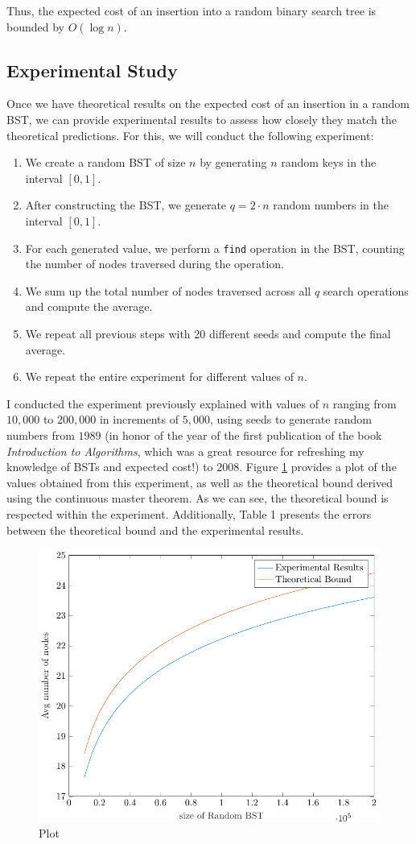 Thus, the expected cost of an insertion into a random binary search tree is bounded by \( O(\log n) \).

\subsection{Experimental Study}
Once we have theoretical results on the expected cost of an insertion in a random BST, we can provide experimental results to assess how closely they match the theoretical predictions. For this, we will conduct the following experiment:

\begin{enumerate}
    \item We create a random BST of size \( n \) by generating \( n \) random keys in the interval \( [0,1] \).
    \item After constructing the BST, we generate \( q = 2\cdot n \) random numbers in the interval \( [0,1] \).
    \item For each generated value, we perform a \texttt{find} operation in the BST, counting the number of nodes traversed during the operation.
    \item We sum up the total number of nodes traversed across all \( q \) search operations and compute the average.
    \item We repeat all previous steps with 20 different seeds and compute the final average.
    \item We repeat the entire experiment for different values of \( n \).
\end{enumerate}

I conducted the experiment previously explained with values of $n$ ranging from $10,000$ to $200,000$ in increments of $5,000$, using seeds to generate random numbers from $1989$ (in honor of the year of the first publication of the book \textit{Introduction to Algorithms}, which was a great resource for refreshing my knowledge of BSTs and expected cost!) to $2008$. Figure \ref{fig:plotBoundIns} provides a plot of the values obtained from this experiment, as well as the theoretical bound derived using the continuous master theorem. As we can see, the theoretical bound is respected within the experiment. Additionally, Table 1 presents the errors between the theoretical bound and the experimental results.

\begin{figure}
    \centering
    \includegraphics[scale=0.65]{plotInsertion.pdf}
    \caption{Plot}
    \label{fig:plotBoundIns}
\end{figure}


